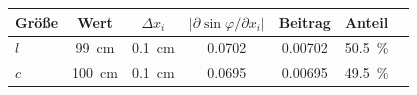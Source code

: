 \begin{tabular}{lcccccl}
\toprule
Größe & Wert & $\Delta x_i$ & $\left|\partial \sin\varphi/\partial x_i\right|$ & Beitrag & Anteil &  \\
\midrule
$l$ & \qty{99}{cm} & \qty{0.1}{cm} & \num{0.0702} & \num{0.00702} & \qty{50.5}{\percent} &  \\
$c$ & \qty{100}{cm} & \qty{0.1}{cm} & \num{0.0695} & \num{0.00695} & \qty{49.5}{\percent} &  \\
\bottomrule
\end{tabular}
